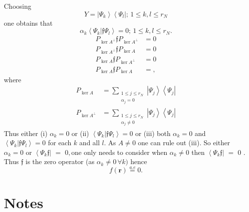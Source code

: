 \documentclass[aps,preprint]{revtex4}%
\begin{document}
\bigskip Choosing
\begin{equation}
Y=\left\vert \Psi_{k}\right\rangle \left\langle \Psi_{l}\right\vert ;\,1\leq
k,l\leq r_{N}%
\end{equation}
one obtains that
\begin{equation}
\alpha_{k}\left\langle \Psi_{k}\left\vert \mathfrak{f}\Psi_{l}\right.
\right\rangle =0;\,1\leq k,l\leq r_{N}.\nonumber
\end{equation}%
\begin{align}
P_{\ker A^{\bot}}\mathfrak{f}P_{\ker A^{\bot}} &  =0\\
P_{\ker A^{\bot}}\mathfrak{f}P_{\ker A} &  =0\\
P_{\ker A}\mathfrak{f}P_{\ker A^{\bot}} &  =0\\
P_{\ker A}\mathfrak{f}P_{\ker A} &  =,
\end{align}
where%
\begin{align}
P_{\ker A} &  =\sum_{\substack{1\leq j\leq r_{N}\\\alpha_{j}=0}}\left\vert
\Psi_{j}\right\rangle \left\langle \Psi_{j}\right\vert \\
P_{\ker A^{\bot}} &  =\sum_{\substack{1\leq j\leq r_{N}\\\alpha_{j}\neq
0}}\left\vert \Psi_{j}\right\rangle \left\langle \Psi_{j}\right\vert
\end{align}
Thus either (i) $\alpha_{k}=0$ or (ii) $\left\langle \Psi_{k}\left\vert
\mathfrak{f}\Psi_{l}\right.  \right\rangle =0$ or (iii) both $\alpha_{k}=0$
and $\left\langle \Psi_{k}\left\vert \mathfrak{f}\Psi_{l}\right.
\right\rangle =0$ for each $k$ and all $l.$ As $A\neq0$ one can rule out
(iii). So either $\alpha_{k}=0$ or $\left\langle \Psi_{k}\mathfrak{f}%
\right\vert $ $=$ $0,$one only needs to consider when $\alpha_{k}\neq0$ then
$\left\langle \Psi_{k}\mathfrak{f}\right\vert $ $=$ $0$ . Thus $\mathfrak{f}$
is the zero operator (as $\alpha_{k}\neq0\,\forall k)$ hence
\begin{equation}
f\left(  \boldsymbol{r}\right)  \overset{a.e}{=}0.
\end{equation}


\section{Notes}%
\end{document}
